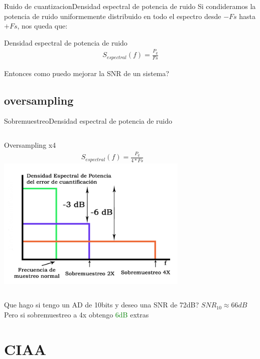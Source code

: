 \begin{frame}{Ruido de cuantizacion}{Densidad espectral de potencia de ruido}
   Si condideramos la potencia de ruido uniformemente distribuido en todo el espectro desde $-Fs$ hasta $+Fs$, nos queda que:
   \begin{block}{Densidad espectral de potencia de ruido}
      \begin{align*}
         S_{espectral}(f) = \frac{P_q}{Fs}
      \end{align*}
   \end{block}
   Entonces como puedo mejorar la SNR de un sistema?
   \vfill
\end{frame}
\subsection{oversampling}
\begin{frame}{Sobremuestreo}{Densidad espectral de potencia de ruido}
   \begin{columns}[onlytextwidth]
      Oversampling x4
      \begin{align*}
         S_{espectral}(f) = \frac{P_q}{4*Fs}
      \end{align*}
      \center\includegraphics[width=0.8\textwidth]{1_clase/oversampling}
   \end{columns}
   \vfill
   Que hago si tengo un AD de 10bits y deseo una SNR de 72dB?
   $SNR_{10}\approx 66dB$
   Pero si sobremuestreo a 4x obtengo \textcolor{green}{6dB} extras
\end{frame}
\section{CIAA}

